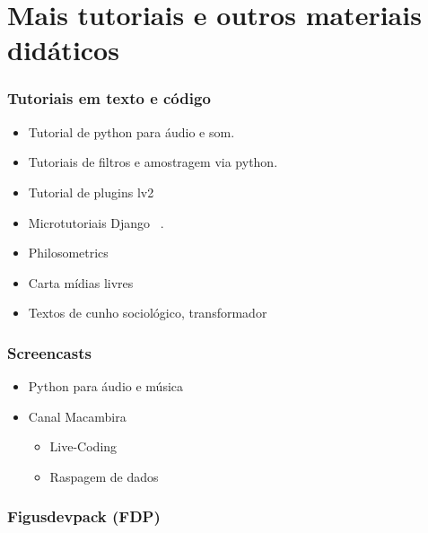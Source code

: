 \chapter{Mais tutoriais e outros materiais didáticos} %
\label{cap:tutsDidads}

\subsection{Tutoriais em texto e código}
\begin{itemize}
    \item Tutorial de python para áudio e som.

    \item Tutoriais de filtros e amostragem via python.

    \item Tutorial de plugins lv2

    \item Microtutoriais Django ~\cite{dmicrotuts}.

    \item Philosometrics

    \item Carta mídias livres

    \item Textos de cunho sociológico, transformador

\end{itemize}

\subsection{Screencasts}

\begin{itemize}
    \item Python para áudio e música

    \item Canal Macambira

    \begin{itemize}
	\item Live-Coding
	\item Raspagem de dados
    \end{itemize}
\end{itemize}



\subsection{Figusdevpack (FDP)}


